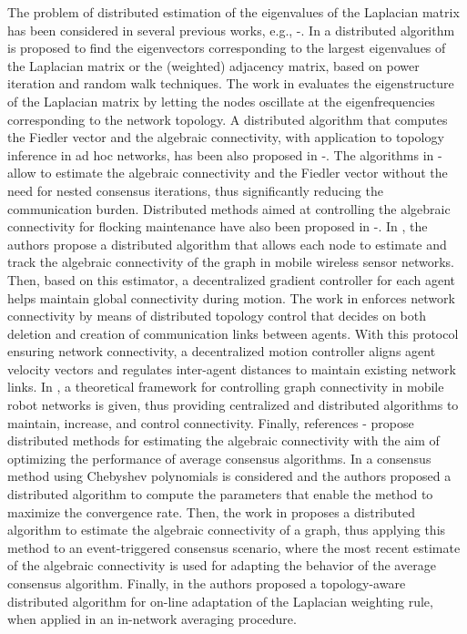 \documentclass[10pt,twocolumn]{IEEEtran}
\begin{document}
The problem of distributed estimation of the eigenvalues of the Laplacian matrix has been considered in several previous works, e.g., \cite{Kempe-McSherry}-\cite{Bertrand-Moonen2}. In \cite{Kempe-McSherry} a distributed algorithm is proposed to find the  eigenvectors corresponding to the  largest eigenvalues of the Laplacian matrix or the (weighted) adjacency matrix, based on power iteration and random walk techniques. The work in \cite{Franceschelli-Gasparri-Giua-C. Seatzu} evaluates the eigenstructure of the Laplacian matrix by letting the nodes oscillate at the eigenfrequencies corresponding to the network topology. A distributed algorithm that computes the Fiedler vector and the algebraic connectivity, with application to topology inference in ad hoc networks, has been also proposed in \cite{Bertrand-Moonen}-\cite{Bertrand-Moonen2}. The algorithms in \cite{Franceschelli-Gasparri-Giua-C. Seatzu}-\cite{Bertrand-Moonen2} allow to estimate the algebraic connectivity and the Fiedler vector without the need for nested consensus iterations, thus significantly reducing the communication burden. Distributed methods aimed at controlling the algebraic connectivity for flocking maintenance have also been proposed in   \cite{Yang-Freeman}-\cite{Zavlanos-Egerstedt-Pappas}. In \cite{Yang-Freeman}, the authors propose a distributed algorithm that allows each node to estimate and track the algebraic connectivity of the graph in mobile wireless sensor networks. Then, based on this estimator, a decentralized gradient controller for each agent helps maintain global connectivity during motion. The work in \cite{Zavlanos-Tanner-Jadbabaie-Pappas} enforces network connectivity by means of distributed topology control that decides on both deletion and creation of communication links between agents. With this protocol ensuring network connectivity, a decentralized motion controller aligns agent velocity vectors and regulates inter-agent distances to maintain existing network links. In \cite{Zavlanos-Egerstedt-Pappas}, a theoretical framework for controlling graph connectivity in mobile robot networks is given, thus providing centralized and distributed algorithms to maintain, increase, and control connectivity. Finally, references \cite{Montijano-Montijano-Sagues}-\cite{Bertrand-Moonen3} propose distributed methods for estimating the algebraic connectivity with the aim of optimizing the performance of average consensus algorithms. In \cite{Montijano-Montijano-Sagues} a consensus method using Chebyshev polynomials is considered and the authors proposed a distributed algorithm to compute the parameters that enable the method to maximize the convergence rate. Then, the work in \cite{Aragues-Shi-Dimarogonas-Sagues-Johansson} proposes a distributed algorithm to estimate the algebraic connectivity of a graph, thus applying this method to an event-triggered consensus scenario, where the most recent estimate of the algebraic connectivity is used for adapting the behavior of the average consensus algorithm. Finally, in \cite{Bertrand-Moonen3} the authors proposed a topology-aware distributed algorithm for on-line adaptation of the Laplacian weighting rule, when applied in an in-network averaging procedure.
\end{document}
